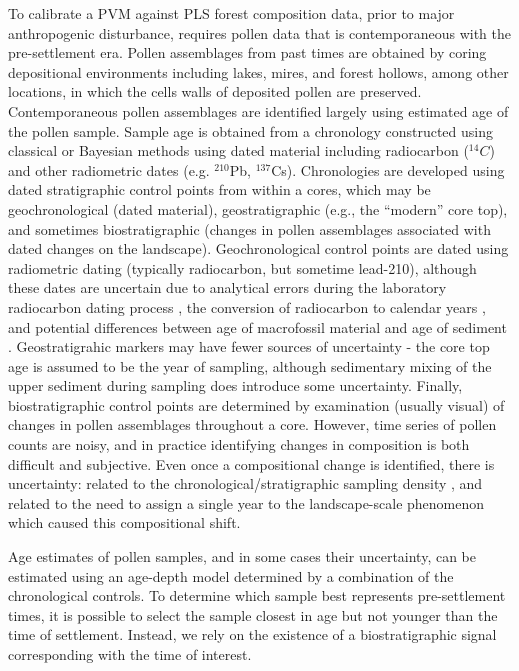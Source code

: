 \documentclass[12pt]{article}
\begin{document}
To calibrate a PVM against PLS forest composition data, prior to major
anthropogenic disturbance, requires pollen data that is
contemporaneous with the pre-settlement era. Pollen assemblages from
past times are obtained by coring depositional environments including
lakes, mires, and forest hollows, among other locations, in which the
cells walls of deposited pollen are preserved. Contemporaneous pollen
assemblages are identified largely using estimated age of the pollen
sample. Sample age is obtained from a chronology constructed using
classical \citep{blaauw2010methods} or Bayesian
\citep{blaauw2011flexible, buck1999bcal, blaauw2005radiocarbon,
  ramsey1995radiocarbon} methods using dated material including
radiocarbon (${}^{14}C$) and other radiometric dates (e.g. $^{210}$Pb,
$^{137}$Cs). Chronologies are developed using dated stratigraphic
control points from within a cores, which may be geochronological
(dated material), geostratigraphic (e.g., the ``modern'' core top),
and sometimes biostratigraphic (changes in pollen assemblages
associated with dated changes on the landscape). Geochronological
control points are dated using radiometric dating (typically
radiocarbon, but sometime lead-210), although these dates are
uncertain due to analytical errors during the laboratory radiocarbon
dating process \citep{ward1978procedures}, the conversion of
radiocarbon to calendar years \citep{reimer2013intcal13}, and
potential differences between age of macrofossil material and age of
sediment \citep{blois2011methodological}. Geostratigrahic markers may
have fewer sources of uncertainty - the core top age is assumed to be
the year of sampling, although sedimentary mixing of the upper
sediment during sampling does introduce some uncertainty. Finally,
biostratigraphic control points are determined by examination (usually
visual) of changes in pollen assemblages throughout a core. However,
time series of pollen counts are noisy, and in practice identifying
changes in composition is both difficult and subjective. Even once a
compositional change is identified, there is uncertainty: related to
the chronological/stratigraphic sampling density
\citep{liu2012temporal}, and related to the need to assign a single
year to the landscape-scale phenomenon which caused this compositional
shift.

Age estimates of pollen samples, and in some cases their uncertainty,
can be estimated using an age-depth model determined by a combination
of the chronological controls. To determine which sample best
represents pre-settlement times, it is possible to select the sample
closest in age but not younger than the time of settlement. Instead,
we rely on the existence of a biostratigraphic signal corresponding
with the time of interest.
\end{document}
